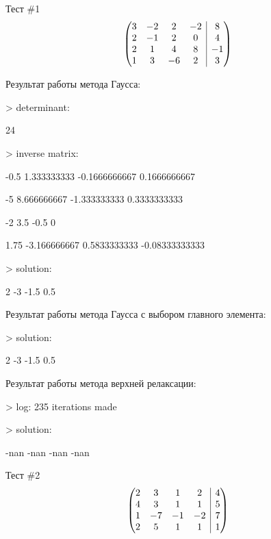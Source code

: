 \documentclass[12pt, a4paper]{report}
\makeatletter
\newenvironment{amatrix}[1]{%
        \left(\begin{array}{@{}*{#1}{c}|c@{}}
}{%
        \end{array}\right)
}
\makeatother
\begin{document}
{%
\vspace{1cm}
\large{Тест \#1}
\[\begin{amatrix}{4}
        3 & -2 &  2 & -2 &  8 \\
        2 & -1 &  2 &  0 &  4 \\
        2 &  1 &  4 &  8 & -1 \\
        1 &  3 & -6 &  2 &  3 \\
\end{amatrix}\]

\normalsize{Результат работы метода Гаусса: \par}
\normalsize{> determinant: \par
            24 \par
            > inverse matrix: \par
            -0.5     1.333333333   -0.1666666667    0.1666666667 \par
              -5     8.666666667    -1.333333333    0.3333333333 \par
              -2             3.5            -0.5               0 \par
            1.75    -3.166666667    0.5833333333  -0.08333333333 \par
            > solution: \par
            2              -3            -1.5             0.5 \par}

\vspace{0.25cm}
\normalsize{Результат работы метода Гаусса с выбором главного элемента: \par}
\normalsize{> solution: \par
            2              -3            -1.5             0.5 \par}
\vspace{0.25cm}
\normalsize{Результат работы метода верхней релаксации: \par}
\normalsize{> log: 235 iterations made \par
            > solution: \par
            -nan              -nan            -nan             -nan \par}
\vspace{1cm}

\large{Тест \#2}
\[\begin{amatrix}{4}
        2 &  3 &  1 &  2 &  4 \\
        4 &  3 &  1 &  1 &  5 \\
        1 & -7 & -1 & -2 &  7 \\
        2 &  5 &  1 &  1 &  1 \\
\end{amatrix}\]

}
\end{document}
